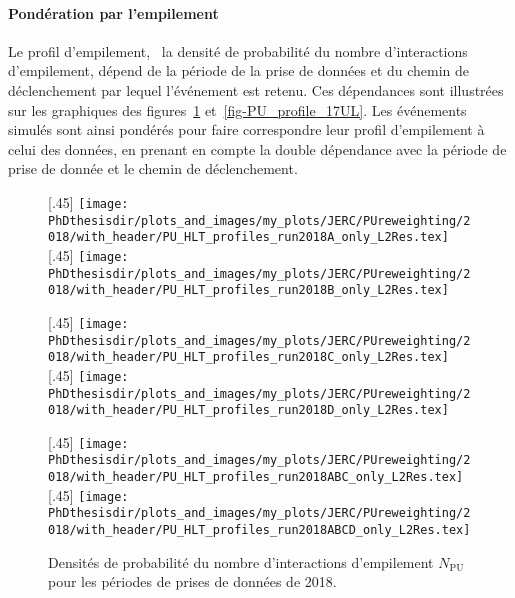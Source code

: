 \paragraph{Pondération par l'empilement}
Le profil d'empilement, \ie\ la densité de probabilité du nombre d'interactions d'empilement, dépend de la période de la prise de données et du chemin de déclenchement par lequel l'événement est retenu. Ces dépendances sont illustrées sur les graphiques des figures~\ref{fig-PU_profile_18} et~\ref{fig-PU_profile_17UL}.
Les événements simulés sont ainsi pondérés pour faire correspondre leur profil d'empilement à celui des données, en prenant en compte la double dépendance avec la période de prise de donnée et le chemin de déclenchement.
\begin{figure}[p]
\centering
{}[.45\textwidth]
{\texttt{[image: \\PhDthesisdir/plots\_and\_images/my\_plots/JERC/PUreweighting/2018/with\_header/PU\_HLT\_profiles\_run2018A\_only\_L2Res.tex]}\vspace{-.5\baselineskip}}
\hfill
{}[.45\textwidth]
{\texttt{[image: \\PhDthesisdir/plots\_and\_images/my\_plots/JERC/PUreweighting/2018/with\_header/PU\_HLT\_profiles\_run2018B\_only\_L2Res.tex]}\vspace{-.5\baselineskip}}

\vspace{.75\baselineskip}

[.45\textwidth]
{\texttt{[image: \\PhDthesisdir/plots\_and\_images/my\_plots/JERC/PUreweighting/2018/with\_header/PU\_HLT\_profiles\_run2018C\_only\_L2Res.tex]}\vspace{-.5\baselineskip}}
\hfill
{}[.45\textwidth]
{\texttt{[image: \\PhDthesisdir/plots\_and\_images/my\_plots/JERC/PUreweighting/2018/with\_header/PU\_HLT\_profiles\_run2018D\_only\_L2Res.tex]}\vspace{-.5\baselineskip}}

\vspace{.75\baselineskip}

[.45\textwidth]
{\texttt{[image: \\PhDthesisdir/plots\_and\_images/my\_plots/JERC/PUreweighting/2018/with\_header/PU\_HLT\_profiles\_run2018ABC\_only\_L2Res.tex]}\vspace{-.5\baselineskip}}
\hfill
{}[.45\textwidth]
{\texttt{[image: \\PhDthesisdir/plots\_and\_images/my\_plots/JERC/PUreweighting/2018/with\_header/PU\_HLT\_profiles\_run2018ABCD\_only\_L2Res.tex]}\vspace{-.5\baselineskip}}

\caption[Densités de probabilité de $N_\text{PU}$ pour 2018.]{Densités de probabilité du nombre d'interactions d'empilement $N_\text{PU}$ pour les périodes de prises de données de 2018.}
\label{fig-PU_profile_18}
\end{figure}
